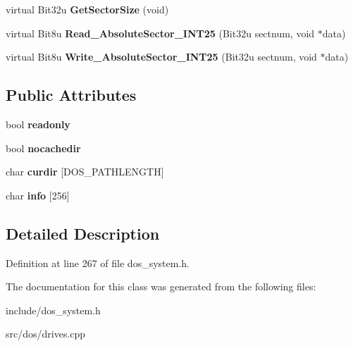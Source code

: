 \begin{DoxyCompactItemize}
\item 
\hypertarget{classDOS__Drive_ae97299ed627e77a4c3339f1e2c510f83}{virtual Bit32u {\bfseries Get\-Sector\-Size} (void)}\label{classDOS__Drive_ae97299ed627e77a4c3339f1e2c510f83}

\item 
\hypertarget{classDOS__Drive_a94f542c8b7122ef5a7b653bad2e2f77d}{virtual Bit8u {\bfseries Read\-\_\-\-Absolute\-Sector\-\_\-\-I\-N\-T25} (Bit32u sectnum, void $\ast$data)}\label{classDOS__Drive_a94f542c8b7122ef5a7b653bad2e2f77d}

\item 
\hypertarget{classDOS__Drive_a66055f5dab842085d207b9ec796a2089}{virtual Bit8u {\bfseries Write\-\_\-\-Absolute\-Sector\-\_\-\-I\-N\-T25} (Bit32u sectnum, void $\ast$data)}\label{classDOS__Drive_a66055f5dab842085d207b9ec796a2089}

\end{DoxyCompactItemize}
\subsection*{Public Attributes}
\begin{DoxyCompactItemize}
\item 
\hypertarget{classDOS__Drive_aa7a3f21acf8787c1bad16d2c4fb5c53c}{bool {\bfseries readonly}}\label{classDOS__Drive_aa7a3f21acf8787c1bad16d2c4fb5c53c}

\item 
\hypertarget{classDOS__Drive_ab8a268c6350773fa0e8b8c000b691447}{bool {\bfseries nocachedir}}\label{classDOS__Drive_ab8a268c6350773fa0e8b8c000b691447}

\item 
\hypertarget{classDOS__Drive_a781fd315606de345f8eab325c2a17c2e}{char {\bfseries curdir} \mbox{[}D\-O\-S\-\_\-\-P\-A\-T\-H\-L\-E\-N\-G\-T\-H\mbox{]}}\label{classDOS__Drive_a781fd315606de345f8eab325c2a17c2e}

\item 
\hypertarget{classDOS__Drive_a3e2b1d7526c099ba38ba991b9d2623e1}{char {\bfseries info} \mbox{[}256\mbox{]}}\label{classDOS__Drive_a3e2b1d7526c099ba38ba991b9d2623e1}

\end{DoxyCompactItemize}


\subsection{Detailed Description}


Definition at line 267 of file dos\-\_\-system.\-h.



The documentation for this class was generated from the following files\-:\begin{DoxyCompactItemize}
\item 
include/dos\-\_\-system.\-h\item 
src/dos/drives.\-cpp\end{DoxyCompactItemize}
